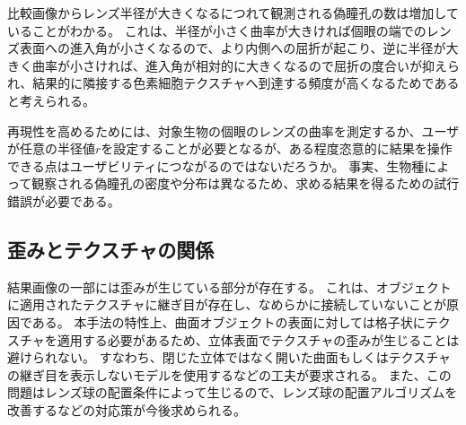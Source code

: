 比較画像からレンズ半径が大きくなるにつれて観測される偽瞳孔の数は増加していることがわかる。
これは、半径が小さく曲率が大きければ個眼の端でのレンズ表面への進入角が小さくなるので、より内側への屈折が起こり、逆に半径が大きく曲率が小さければ、進入角が相対的に大きくなるので屈折の度合いが抑えられ、結果的に隣接する色素細胞テクスチャへ到達する頻度が高くなるためであると考えられる。

再現性を高めるためには、対象生物の個眼のレンズの曲率を測定するか、ユーザが任意の半径値$r$を設定することが必要となるが、ある程度恣意的に結果を操作できる点はユーザビリティにつながるのではないだろうか。
事実、生物種によって観察される偽瞳孔の密度や分布は異なるため、求める結果を得るための試行錯誤が必要である。



\subsection{歪みとテクスチャの関係}
\label{SSDistortion}

結果画像の一部には歪みが生じている部分が存在する。
これは、オブジェクトに適用されたテクスチャに継ぎ目が存在し、なめらかに接続していないことが原因である。
本手法の特性上、曲面オブジェクトの表面に対しては格子状にテクスチャを適用する必要があるため、立体表面でテクスチャの歪みが生じることは避けられない。
すなわち、閉じた立体ではなく開いた曲面もしくはテクスチャの継ぎ目を表示しないモデルを使用するなどの工夫が要求される。
また、この問題はレンズ球の配置条件によって生じるので、レンズ球の配置アルゴリズムを改善するなどの対応策が今後求められる。

